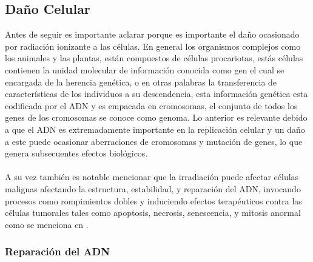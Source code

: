 \subsection{Daño Celular}
Antes de seguir es importante aclarar porque es importante el daño ocasionado por radiación ionizante a las células. En general los organismos complejos como los animales y las plantas, están compuestos de células procariotas, estás células contienen la unidad molecular de información conocida como gen el cual se encargada de la herencia genética, o en otras palabras la transferencia de características de los individuos a su descendencia, esta información genética esta codificada por el ADN y es empacada en cromosomas, el conjunto de todos los genes de los cromosomas se conoce como genoma. Lo anterior es relevante debido a que el ADN es extremadamente importante en la replicación celular y un daño a este puede ocasionar aberraciones de cromosomas y mutación de genes, lo que genera subsecuentes efectos biológicos.\\
\\
A su vez también es notable mencionar que la irradiación puede afectar células malignas afectando la estructura, estabilidad, y reparación del ADN, invocando procesos como rompimientos dobles y induciendo efectos terapéuticos contra las células tumorales tales como apoptosis, necrosis,  senescencia, y mitosis anormal como se menciona en \cite{cancer}.\\




\subsubsection{Reparación del ADN}



